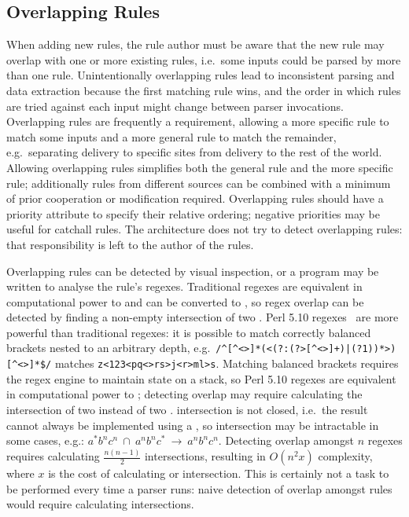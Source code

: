 \subsection{Overlapping Rules}

\label{overlapping rules in architecture}

When adding new rules, the rule author must be aware that the new rule may
overlap with one or more existing rules, i.e.\ some inputs could be parsed
by more than one rule.  Unintentionally overlapping rules lead to
inconsistent parsing and data extraction because the first matching rule
wins, and the order in which rules are tried against each input might
change between parser invocations.  Overlapping rules are frequently a
requirement, allowing a more specific rule to match some inputs and a more
general rule to match the remainder, e.g.\ separating 
delivery to specific sites from  delivery to the rest of the
world.  Allowing overlapping rules simplifies both the general rule and the
more specific rule; additionally rules from different sources can be
combined with a minimum of prior cooperation or modification required.
Overlapping rules should have a priority attribute to specify their
relative ordering; negative priorities may be useful for catchall rules.
The architecture does not try to detect overlapping rules: that
responsibility is left to the author of the rules.

Overlapping rules can be detected by visual inspection, or a program may be
written to analyse the rule's regexes.  Traditional regexes are equivalent
in computational power to  and can be converted to
, so regex overlap can be detected by finding a non-empty
intersection of two \@.  Perl 5.10 regexes~\cite{perlre} are
more powerful than traditional regexes: it is possible to match correctly
balanced brackets nested to an arbitrary depth, e.g.\
\verb!/^[^<>]*(<(?:(?>[^<>]+)|(?1))*>)[^<>]*$/!  matches
\verb!z<123<pq<>rs>j<r>ml>s!.  Matching balanced brackets requires the
regex engine to maintain state on a stack, so Perl 5.10 regexes are
equivalent in computational power to ; detecting overlap may
require calculating the intersection of two  instead of two
\acronym{FA}.   intersection is not closed, i.e.\ the result
cannot always be implemented using a \acronym{PDA}, so intersection may be
intractable in some cases, e.g.:
$a^{*}b^{n}c^{n}~\cap~a^{n}b^{n}c^{*}~\rightarrow~a^{n}b^{n}c^{n}$.
Detecting overlap amongst $n$ regexes requires calculating
$\frac{n\left(n-1\right)}{2}$ intersections, resulting in
$O\left(n^{2}x\right)$ complexity, where $x$ is the cost of calculating
\acronym{FA} or \acronym{PDA} intersection.  This is certainly not a task
to be performed every time a parser runs: naive detection of overlap
amongst \parsernames{} \numberOFrules{} rules would require calculating
\numberOFruleINTERSECTIONS{} intersections.

